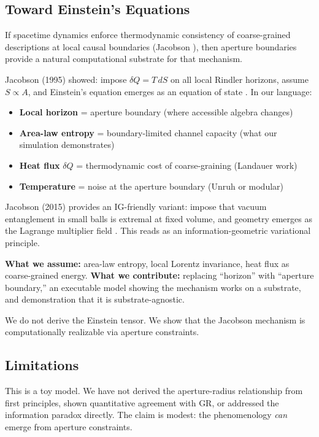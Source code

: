 \documentclass[11pt,a4paper]{article}
\begin{document}
\subsection{Toward Einstein's Equations}

If spacetime dynamics enforce thermodynamic consistency of coarse-grained descriptions at local causal boundaries (Jacobson \cite{jacobson1995,jacobson2015}), then aperture boundaries provide a natural computational substrate for that mechanism.

Jacobson (1995) showed: impose $\delta Q = T\,dS$ on all local Rindler horizons, assume $S \propto A$, and Einstein's equation emerges as an equation of state \cite{jacobson1995}. In our language:
\begin{itemize}
    \item \textbf{Local horizon} = aperture boundary (where accessible algebra changes)
    \item \textbf{Area-law entropy} = boundary-limited channel capacity (what our simulation demonstrates)
    \item \textbf{Heat flux} $\delta Q$ = thermodynamic cost of coarse-graining (Landauer work)
    \item \textbf{Temperature} = noise at the aperture boundary (Unruh or modular)
\end{itemize}

Jacobson (2015) provides an IG-friendly variant: impose that vacuum entanglement in small balls is extremal at fixed volume, and geometry emerges as the Lagrange multiplier field \cite{jacobson2015}. This reads as an information-geometric variational principle.

\textbf{What we assume:} area-law entropy, local Lorentz invariance, heat flux as coarse-grained energy. \textbf{What we contribute:} replacing ``horizon'' with ``aperture boundary,'' an executable model showing the mechanism works on a substrate, and demonstration that it is substrate-agnostic.

We do not derive the Einstein tensor. We show that the Jacobson mechanism is computationally realizable via aperture constraints.

\subsection{Limitations}

This is a toy model. We have not derived the aperture-radius relationship from first principles, shown quantitative agreement with GR, or addressed the information paradox directly. The claim is modest: the phenomenology \emph{can} emerge from aperture constraints.
\end{document}
